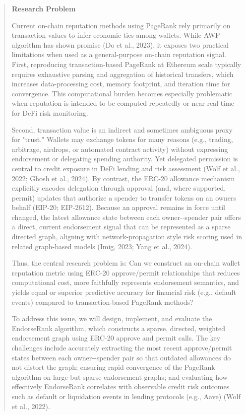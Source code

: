 \documentclass[
]{article}
\begin{document}
\begin{quote}
\protect{}\label{45gx6lhyoey9}{}\textbf{Research Problem}

Current on-chain reputation methods using PageRank rely primarily on transaction values to infer economic ties among wallets. While AWP algorithm has shown promise (Do et al., 2023), it exposes two practical limitations when used as a general-purpose on-chain reputation signal. First, reproducing transaction-based PageRank at Ethereum scale typically requires exhaustive parsing and aggregation of historical transfers, which increases data-processing cost, memory footprint, and iteration time for convergence. This computational burden becomes especially problematic when reputation is intended to be computed repeatedly or near real-time for DeFi risk monitoring.

Second, transaction value is an indirect and sometimes ambiguous proxy for "trust." Wallets may exchange tokens for many reasons (e.g., trading, arbitrage, airdrops, or automated contract activity) without expressing endorsement or delegating spending authority. Yet delegated permission is central to credit exposure in DeFi lending and risk assessment (Wolf et al., 2022; Ghosh et al., 2024). By contrast, the ERC-20 allowance mechanism explicitly encodes delegation through approval (and, where supported, permit) updates that authorize a spender to transfer tokens on an owner\textquotesingle s behalf (EIP-20; EIP-2612). Because an approval remains in force until changed, the latest allowance state between each owner-\/-spender pair offers a direct, current endorsement signal that can be represented as a sparse directed graph, aligning with network-propagation style risk scoring used in related graph-based models (Imig, 2023; Yang et al., 2024).

Thus, the central research problem is: Can we construct an on-chain wallet reputation metric using ERC-20 approve/permit relationships that reduces computational cost, more faithfully represents endorsement semantics, and yields equal or superior predictive accuracy for financial risk (e.g., default events) compared to transaction-based PageRank methods?

To address this issue, we will design, implement, and evaluate the EndorseRank algorithm, which constructs a sparse, directed, weighted endorsement graph using ERC-20 approve and permit calls. The key challenges include accurately extracting the most recent approve/permit states between each owner-\/-spender pair so that outdated allowances do not distort the graph; ensuring rapid convergence of the PageRank algorithm on large but sparse endorsement graphs; and evaluating how effectively EndorseRank correlates with observable credit risk outcomes such as default or liquidation events in lending protocols (e.g., Aave) (Wolf et al., 2022).
\end{quote}
\end{document}
